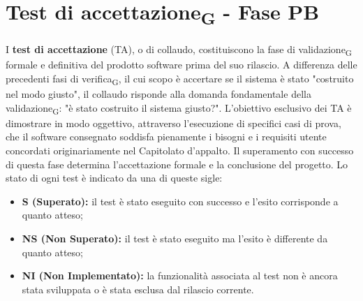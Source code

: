 \documentclass[11pt,a4paper]{article}
\newcommand{\gls}[1]{#1\textsubscript{G}}
\begin{document}
\newpage

\section{\gls{Test di accettazione} - Fase PB}
I \textbf{test di accettazione} (TA), o di collaudo, costituiscono la fase di \gls{validazione} formale e definitiva del prodotto software prima del suo rilascio. A differenza delle precedenti fasi di \gls{verifica}, il cui scopo è accertare se il sistema è stato "costruito nel modo giusto", il collaudo risponde alla domanda fondamentale della \gls{validazione}: "è stato costruito il sistema giusto?". L'obiettivo esclusivo dei TA è dimostrare in modo oggettivo, attraverso l'esecuzione di specifici casi di prova, che il software consegnato soddisfa pienamente i bisogni e i requisiti utente concordati originariamente nel Capitolato d'appalto. Il superamento con successo di questa fase determina l'accettazione formale e la conclusione del progetto.
Lo stato di ogni test è indicato da una di queste sigle:
\begin{itemize}
    \item \textbf{S (Superato):} il test è stato eseguito con successo e l'esito corrisponde a quanto atteso;
    \item \textbf{NS (Non Superato):} il test è stato eseguito ma l'esito è differente da quanto atteso;
    \item \textbf{NI (Non Implementato):} la funzionalità associata al test non è ancora stata sviluppata o è stata esclusa dal rilascio corrente.
\end{itemize}
\end{document}
